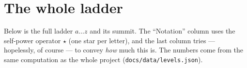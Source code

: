 \section{The whole ladder}

Below is the full ladder \(a \dots z\) and its summit. The ``Notation'' column uses the
self-power operator \(\star\) (one star per letter), and the last column tries ---
hopelessly, of course --- to convey \emph{how} much this is. The numbers come from the same
computation as the whole project (\texttt{docs/data/levels.json}).


